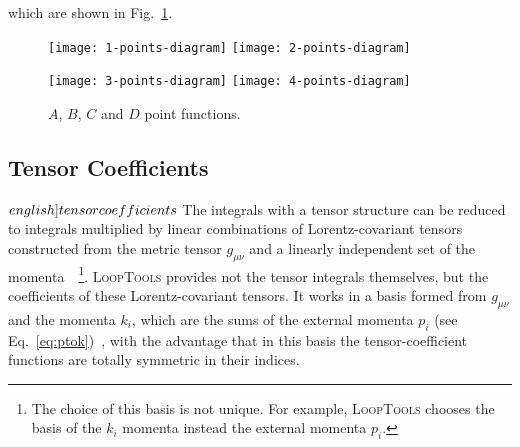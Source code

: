 %
which are shown in Fig.~\ref{fig:n-point-diagrams}.
%
\begin{figure}[h]
\centering
\texttt{[image: 1-points-diagram]} \hspace{1 cm}
\texttt{[image: 2-points-diagram]} 

\texttt{[image: 3-points-diagram]}\hspace{1 cm}
\texttt{[image: 4-points-diagram]}
\caption{$A$, $B$, $C$ and $D$ point functions.}
\label{fig:n-point-diagrams}
\end{figure}


\subsection{Tensor Coefficients}
\label{sec:tensor-coefficients}

$\index{tensor coefficients}%
$%
The integrals with a tensor structure can be reduced to integrals multiplied by linear
combinations of Lorentz-covariant tensors constructed from the metric
tensor $g_{\mu\nu}$ and a linearly independent set of the momenta~\cite{Passarino:1978jh}~\footnote{The choice of this basis is not unique. 
For example, \textsc{LoopTools} chooses the basis of the $k_i$ momenta instead the external momenta $p_i$.
}.
%
\textsc{LoopTools} provides not the tensor integrals themselves, but the coefficients of
these Lorentz-covariant tensors.  It works in a basis formed from
$g_{\mu\nu}$ and the momenta $k_i$, which are the sums of the external
momenta $p_i$ (see Eq.~\eqref{eq:ptok})~\cite{Denner:1991kt}, with the advantage that in this basis
the tensor-coefficient functions are totally symmetric in their indices.

